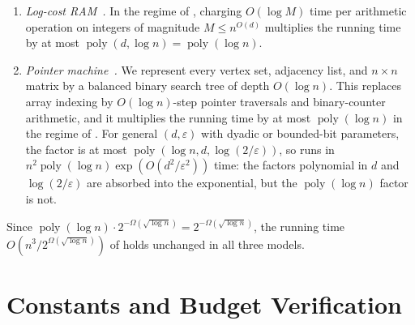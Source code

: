 \documentclass[11pt]{article}
\theoremstyle{definition}
\renewcommand{\label}[1]{}%
\newcommand{\E}{\mathbb{E}}
\newcommand{\poly}{\operatorname{poly}}
\newcommand{\abs}[1]{\left\lvert #1 \right\rvert}
\newcommand{\dens}[1]{\E[#1]}
\begin{document}
\begin{enumerate}[leftmargin=*]
\begin{itemize}[leftmargin=*]
        \item the raw value $t := \lfloor c_0\sqrt{\lfloor \log_2 n \rfloor} \rfloor = \lfloor \lfloor \sqrt{\lfloor \log_2 n \rfloor} \rfloor / b_0 \rfloor$, via $b_0^2 t^2 \le \lfloor \log_2 n \rfloor < b_0^2(t+1)^2$ (for $c_0 = 1/b_0$ with an integer $b_0 \ge 1$;  of  then clamps it to $d = \max(320, t)$);
        \item the test $\dens{C_k} = \abs{S_k}/(\abs{X_k}\abs{Z_k}) > 2^{-d/160}$ at , via $\abs{S_k}^{160} 2^d > (\abs{X_k}\abs{Z_k})^{160}$.
    \end{itemize}
    \item \emph{Log-cost RAM~\cite{CookR73}.} In the regime of , charging $O(\log M)$ time per arithmetic operation on integers of magnitude $M \le n^{O(d)}$ multiplies the running time by at most $\poly(d, \log n) = \poly(\log n)$.
    \item \emph{Pointer machine~\cite{Schonhage80,BenAmram95}.} We represent every vertex set, adjacency list, and $n \times n$ matrix by a balanced binary search tree of depth $O(\log n)$. This replaces array indexing by $O(\log n)$-step pointer traversals and binary-counter arithmetic, and it multiplies the running time by at most $\poly(\log n)$ in the regime of . For general $(d, \varepsilon)$ with dyadic or bounded-bit parameters, the factor is at most $\poly(\log n, d, \log(2/\varepsilon))$, so  runs in $n^2 \poly(\log n) \exp(O(d^2/\varepsilon^2))$ time: the factors polynomial in $d$ and $\log(2/\varepsilon)$ are absorbed into the exponential, but the $\poly(\log n)$ factor is not.
\end{enumerate}
Since $\poly(\log n) \cdot 2^{-\Omega(\sqrt{\log n})} = 2^{-\Omega(\sqrt{\log n})}$, the running time $O(n^3 / 2^{\Omega(\sqrt{\log n})})$ of  holds unchanged in all three models.

\section{Constants and Budget Verification}
\label{app:constants}
\end{document}

